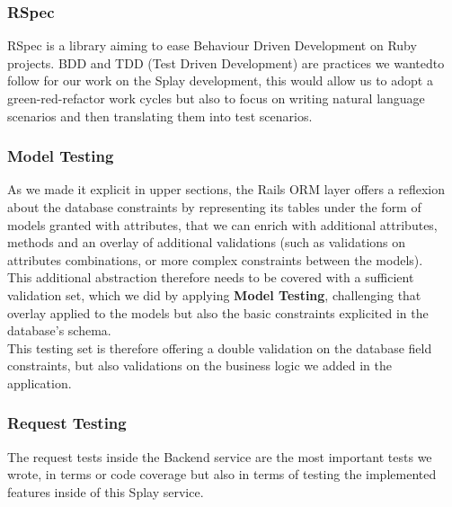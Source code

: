 \documentclass{eplmastersthesis}
\begin{document}
        \subsubsection{RSpec}

          RSpec \cite{rspec} is a library aiming to ease Behaviour Driven
          Development on Ruby projects. BDD and TDD (Test Driven Development) are
          practices we wantedto follow for our work on the Splay development,
          this would allow us to adopt a green-red-refactor work cycles but also
          to focus on writing natural language scenarios and then translating
          them into test scenarios.

        \subsubsection{Model Testing}

          As we made it explicit in upper sections, the Rails ORM layer offers
          a reflexion about the database constraints by representing its
          tables under the form of models granted with attributes, that we can
          enrich with additional attributes, methods and an overlay of
          additional validations (such as validations on attributes
          combinations, or more complex constraints between the models).\\

          This additional abstraction therefore needs to be covered with a
          sufficient validation set, which we did by applying
          \textbf{Model Testing}, challenging that overlay applied to the
          models but also the basic constraints explicited in the database's
          schema.\\

          This testing set is therefore offering a double validation on the
          database field constraints, but also validations on the business
          logic we added in the application.

        \subsubsection{Request Testing}

          The request tests inside the Backend service are the most important
          tests we wrote, in terms or code coverage but also in terms of
          testing the implemented features inside of this Splay service.\\
\end{document}
